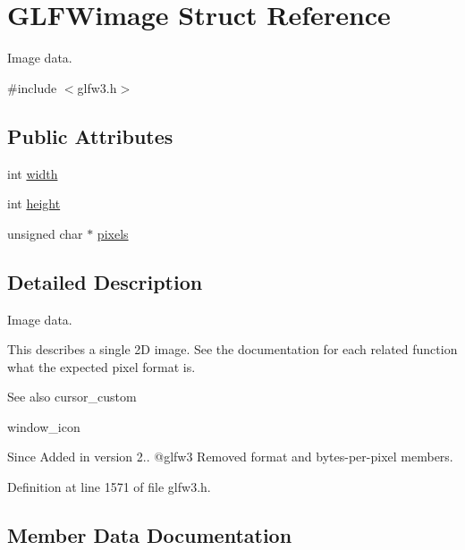 \hypertarget{struct_g_l_f_wimage}{}\section{G\+L\+F\+Wimage Struct Reference}
\label{struct_g_l_f_wimage}


Image data.  




{\ttfamily \#include $<$glfw3.\+h$>$}

\subsection*{Public Attributes}
\begin{DoxyCompactItemize}
\item 
int \mbox{\hyperlink{struct_g_l_f_wimage_af6a71cc999fe6d3aea31dd7e9687d835}{width}}
\item 
int \mbox{\hyperlink{struct_g_l_f_wimage_a0b7d95368f0c80d5e5c9875057c7dbec}{height}}
\item 
unsigned char $\ast$ \mbox{\hyperlink{struct_g_l_f_wimage_a0c532a5c2bb715555279b7817daba0fb}{pixels}}
\end{DoxyCompactItemize}


\subsection{Detailed Description}
Image data. 

This describes a single 2D image. See the documentation for each related function what the expected pixel format is.

\begin{DoxySeeAlso}{See also}
cursor\+\_\+custom 

window\+\_\+icon
\end{DoxySeeAlso}
\begin{DoxySince}{Since}
Added in version 2.. @glfw3 Removed format and bytes-\/per-\/pixel members. 
\end{DoxySince}


Definition at line 1571 of file glfw3.\+h.



\subsection{Member Data Documentation}
\mbox{\label{struct_g_l_f_wimage_a0b7d95368f0c80d5e5c9875057c7dbec}} 
